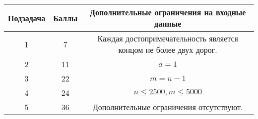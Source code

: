 \begin{center}
\renewcommand{\arraystretch}{1.5}
\begin{tabular}{|c|c|c|}
\hline
Подзадача & Баллы & Дополнительные ограничения на входные данные\\
\hline
1 & 7 & Каждая достопримечательность является концом не более двух
дорог. \\
\hline
2 & 11 & $a = 1$ \\
\hline
3 & 22 & $m = n-1$ \\
\hline
4 & 24 & $n \leq 2500, m \leq 5000$ \\
\hline
5 & 36 & Дополнительные ограничения отсутствуют. \\
\hline
\end{tabular}
\end{center}
